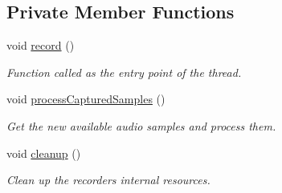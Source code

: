 \subsection*{Private Member Functions}
\begin{DoxyCompactItemize}
\item 
void \mbox{\hyperlink{classsf_1_1_sound_recorder_ac7da8331c382707623dc3671094fc176}{record}} ()
\begin{DoxyCompactList}\small\item\em Function called as the entry point of the thread. \end{DoxyCompactList}\item 
void \mbox{\hyperlink{classsf_1_1_sound_recorder_ab1b7b105c79081d044bc79cc74753ddf}{process\+Captured\+Samples}} ()
\begin{DoxyCompactList}\small\item\em Get the new available audio samples and process them. \end{DoxyCompactList}\item 
void \mbox{\hyperlink{classsf_1_1_sound_recorder_a4532acd98a33a6419e1d9f17d6a280e3}{cleanup}} ()
\begin{DoxyCompactList}\small\item\em Clean up the recorder\textquotesingle{}s internal resources. \end{DoxyCompactList}\end{DoxyCompactItemize}
